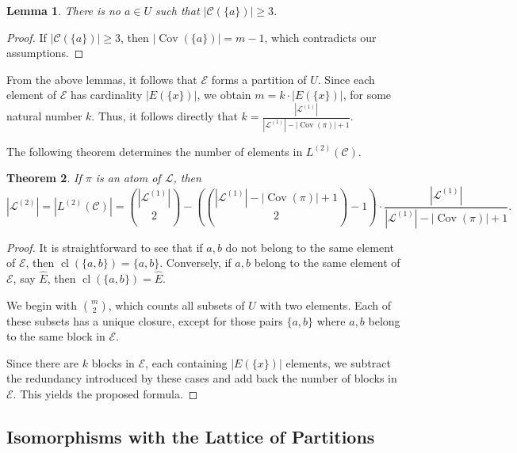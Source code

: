 \documentclass{article}
\newtheorem{theorem}{Theorem}[section]
\newtheorem{lemma}[theorem]{Lemma}
\begin{document}
\begin{lemma}
    There is no \( a \in U \) such that \( |\mathcal{C}(\{a\})| \geq 3 \).
\end{lemma}

\begin{proof}
    If \( |\mathcal{C}(\{a\})| \geq 3 \), then \( |\operatorname{Cov}(\{a\})| = m - 1 \), which contradicts our assumptions.
\end{proof}

From the above lemmas, it follows that \( \mathcal{E} \) forms a partition of \( U \). Since each element of \( \mathcal{E} \) has cardinality \( |E(\{x\})| \), we obtain
$
m = k \cdot |E(\{x\})|
$, for some natural number $k$.
Thus, it follows directly that
$
k = \frac{|\mathcal{L}^{(1)}|}{|\mathcal{L}^{(1)}| - |\operatorname{Cov}(\pi)| + 1}.
$

The following theorem determines the number of elements in \( L^{(2)}(\mathcal{C}) \).

\begin{theorem}\label{counting}
    If $\pi$ is an atom of $\mathcal{L}$, then
    \[
    |\mathcal{L}^{(2)}| = |L^{(2)}(\mathcal{C})| = \binom{|\mathcal{L}^{(1)}|}{2} - \left(\binom{|\mathcal{L}^{(1)}| - |\operatorname{Cov}(\pi)| + 1}{2} - 1\right) \cdot \frac{|\mathcal{L}^{(1)}|}{|\mathcal{L}^{(1)}| - |\operatorname{Cov}(\pi)| + 1}.
    \]
\end{theorem}

\begin{proof}
    It is straightforward to see that if \( a, b \) do not belong to the same element of \( \mathcal{E} \), then \( \operatorname{cl}(\{a,b\}) = \{a,b\} \). Conversely, if \( a, b \) belong to the same element of \( \mathcal{E} \), say \( \hat{E} \), then \( \operatorname{cl}(\{a,b\}) = \hat{E} \).

    We begin with \( \binom{m}{2} \), which counts all subsets of \( U \) with two elements. Each of these subsets has a unique closure, except for those pairs \( \{a, b\} \) where \( a, b \) belong to the same block in \( \mathcal{E} \). 

    Since there are \( k \) blocks in \( \mathcal{E} \), each containing \( |E(\{x\})| \) elements, we subtract the redundancy introduced by these cases and add back the number of blocks in \( \mathcal{E} \). This yields the proposed formula.
\end{proof}



\subsection{Isomorphisms with the Lattice of Partitions}
\end{document}
